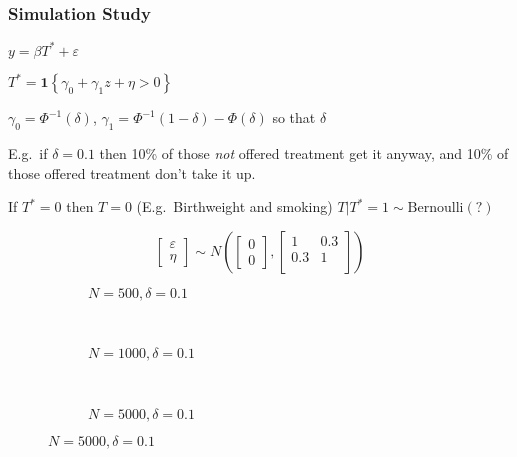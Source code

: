 \documentclass{beamer}
\begin{document}
\begin{frame}
  \frametitle{Simulation Study}
  $y = \beta T^* + \varepsilon$

  $T^* = \mathbf{1}\left\{ \gamma_0 + \gamma_1 z + \eta > 0 \right\}$

  $\gamma_0 = \Phi^{-1}(\delta)$, $\gamma_1 = \Phi^{-1}(1-\delta) - \Phi(\delta)$ so that $\delta$

  E.g.\ if $\delta=0.1$ then 10\% of those \emph{not} offered treatment get it anyway, and 10\% of those offered treatment don't take it up.
  
  If $T^*=0$ then $T=0$ (E.g.\ Birthweight and smoking)
  $T|T^*=1 \sim \mbox{Bernoulli}(?)$

  \[ \left[
  \begin{array}{c}
  \varepsilon \\ \eta
\end{array}
\right] \sim N\left( \left[
\begin{array}{c}
0 \\ 0
\end{array}
\right], \left[
\begin{array}{cc}
1 & 0.3\\
0.3 & 1 \\
\end{array}
\right]\right)\]
\end{frame}
\begin{frame}
  \begin{center}
    {}
  \end{center}
\end{frame}
\begin{frame}
\begin{figure}[h]
  \scriptsize
  \begingroup
  \centering
  \begin{subfigure}[b]{0.31\textwidth}
\caption{\footnotesize $N=500, \delta = 0.1$}
  
  \end{subfigure}
  ~
  \begin{subfigure}[b]{0.31\textwidth}
    \caption{\footnotesize $N=1000, \delta = 0.1$} 
  
  \end{subfigure}
  ~
  \begin{subfigure}[b]{0.31\textwidth}
\caption{\footnotesize $N=5000, \delta = 0.1$}
  
  \end{subfigure}
\endgroup
\end{figure}
\end{frame}
\end{document}
